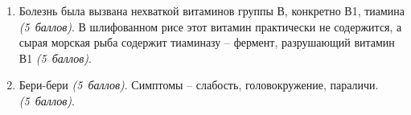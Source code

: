 \solutionSection
\begin{enumerate}
    \item Болезнь была вызвана нехваткой витаминов группы В, конкретно В1, тиамина \textit{(5~баллов)}. В шлифованном рисе этот витамин практически не содержится, а сырая морская рыба содержит тиаминазу – фермент, разрушающий витамин В1 \textit{(5~баллов)}.
    \item Бери-бери \textit{(5~баллов)}. Симптомы – слабость, головокружение, параличи. \textit{(5~баллов)}.
    \end{enumerate}